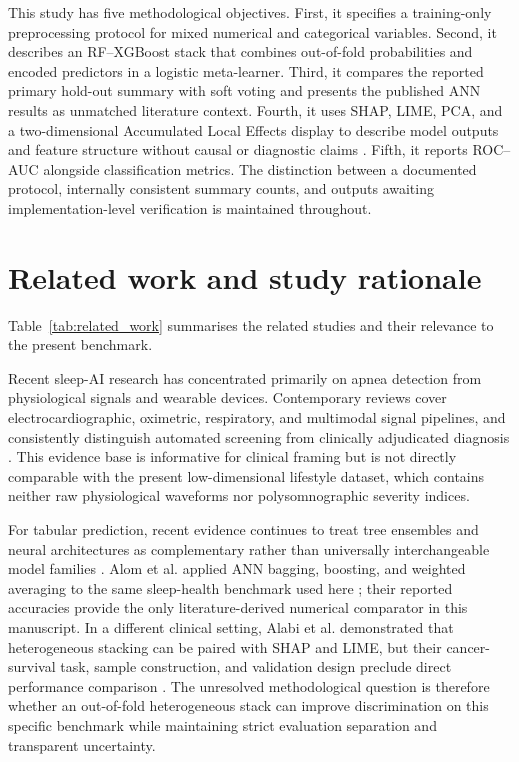 \documentclass[a4paper,fleqn]{cas-dc}
\begin{document}
This study has five methodological objectives. First, it specifies a training-only preprocessing protocol for mixed numerical and categorical variables. Second, it describes an RF--XGBoost stack that combines out-of-fold probabilities and encoded predictors in a logistic meta-learner. Third, it compares the reported primary hold-out summary with soft voting and presents the published ANN results as unmatched literature context. Fourth, it uses SHAP, LIME, PCA, and a two-dimensional Accumulated Local Effects display to describe model outputs and feature structure without causal or diagnostic claims \cite{jung2023,allen2024,pesapane2026}. Fifth, it reports ROC--AUC alongside classification metrics. The distinction between a documented protocol, internally consistent summary counts, and outputs awaiting implementation-level verification is maintained throughout.

\section{Related work and study rationale}
Table~\ref{tab:related_work} summarises the related studies and their relevance to the present benchmark.

Recent sleep-AI research has concentrated primarily on apnea detection from physiological signals and wearable devices. Contemporary reviews cover electrocardiographic, oximetric, respiratory, and multimodal signal pipelines, and consistently distinguish automated screening from clinically adjudicated diagnosis \cite{bazoukis2023,tyagi2023,abdalrazaq2024,giorgi2025}. This evidence base is informative for clinical framing but is not directly comparable with the present low-dimensional lifestyle dataset, which contains neither raw physiological waveforms nor polysomnographic severity indices.

For tabular prediction, recent evidence continues to treat tree ensembles and neural architectures as complementary rather than universally interchangeable model families \cite{borisov2024}. Alom et al. applied ANN bagging, boosting, and weighted averaging to the same sleep-health benchmark used here \cite{alom2024}; their reported accuracies provide the only literature-derived numerical comparator in this manuscript. In a different clinical setting, Alabi et al. demonstrated that heterogeneous stacking can be paired with SHAP and LIME, but their cancer-survival task, sample construction, and validation design preclude direct performance comparison \cite{alabi2023}. The unresolved methodological question is therefore whether an out-of-fold heterogeneous stack can improve discrimination on this specific benchmark while maintaining strict evaluation separation and transparent uncertainty.
\end{document}
